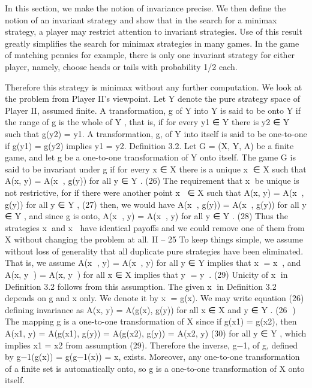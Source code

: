 \documentclass[]{report}
\begin{document}
In this section, we make the notion of invariance precise. We then define the notion of
an invariant strategy and show that in the search for a minimax strategy, a player may
restrict attention to invariant strategies. Use of this result greatly simplifies the search for
minimax strategies in many games. In the game of matching pennies for example, there is
only one invariant strategy for either player, namely, choose heads or tails with probability
1/2 each. 

Therefore this strategy is minimax without any further computation.
We look at the problem from Player II’s viewpoint. Let Y denote the pure strategy
space of Player II, assumed finite. A transformation, g of Y into Y is said to be onto Y
if the range of g is the whole of Y , that is, if for every y1 ∈ Y there is y2 ∈ Y such that
g(y2) = y1. A transformation, g, of Y into itself is said to be one-to-one if g(y1) = g(y2)
implies y1 = y2.
Definition 3.2. Let G = (X, Y, A) be a finite game, and let g be a one-to-one transformation
of Y onto itself. The game G is said to be invariant under g if for every x ∈ X
there is a unique x ∈ X such that
A(x, y) = A(x
, g(y)) for all y ∈ Y . (26)
The requirement that x be unique is not restrictive, for if there were another point
x ∈ X such that
A(x, y) = A(x, g(y)) for all y ∈ Y , (27)
then, we would have A(x
, g(y)) = A(x, g(y)) for all y ∈ Y , and since g is onto,
A(x
, y) = A(x, y) for all y ∈ Y . (28)
Thus the strategies x and x have identical payoffs and we could remove one of them from
X without changing the problem at all.
II – 25
To keep things simple, we assume without loss of generality that all duplicate pure
strategies have been eliminated. That is, we assume
A(x
, y) = A(x, y) for all y ∈ Y implies that x = x, and
A(x, y
) = A(x, y) for all x ∈ X implies that y = y. (29)
Unicity of x in Definition 3.2 follows from this assumption.
The given x in Definition 3.2 depends on g and x only. We denote it by x = g(x).
We may write equation (26) defining invariance as
A(x, y) = A(g(x), g(y)) for all x ∈ X and y ∈ Y . (26
)
The mapping g is a one-to-one transformation of X since if g(x1) = g(x2), then
A(x1, y) = A(g(x1), g(y)) = A(g(x2), g(y)) = A(x2, y) (30)
for all y ∈ Y , which implies x1 = x2 from assumption (29). Therefore the inverse, g−1, of
g, defined by g−1(g(x)) = g(g−1(x)) = x, exists. Moreover, any one-to-one transformation
of a finite set is automatically onto, so g is a one-to-one transformation of X onto itself.
\end{document}
